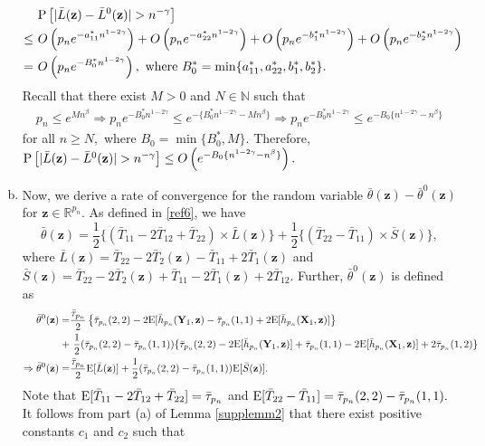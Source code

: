 \documentclass[twoside]{article}
\newcommand{\bX}{\mathbf{X}}
\newcommand{\bY}{\mathbf{Y}}
\newcommand{\bz}{\mathbf{z}}
\newcommand{\0}{\mathbf{0}}
\newcommand{\1}{\mathbf{1}}
\numberwithin{equation}{section}
\begin{document}
\begin{enumerate}[(a)]
\begin{align*}
 &\ {\rm P}\left [|\bar{L}(\bz)- \bar{L}^0(\bz) |>n^{-\gamma}\right ]\\
 \leq &\ O\left (p_ne^{-a^*_{11}n^{1-2\gamma}}\right ) + O\left (p_ne^{-a^*_{22}n^{1-2\gamma}}\right )+O\left( p_n e^{-b^*_1 n^{1-2\gamma}}\right ) + O\left( p_n e^{-b^*_2 n^{1-2\gamma}}\right )\\
 =&\ O\left (p_ne^{-B^*_0 n^{1-2\gamma}}\right ),\text{ where }B^*_0 = \min\{a^*_{11},a^*_{22},b^*_{1},b^*_{2}\}.
\end{align*}
Recall that there exist $M>0$ and $N\in\mathbb{N}$ such that
\begin{align*}
p_n\le e^{Mn^\beta}
\Rightarrow  p_ne^{-B^*_0 n^{1-2\gamma}}\le e^{-\{B^*_0 n^{1-2\gamma}-Mn^\beta\}}
\Rightarrow  p_ne^{-B^*_0 n^{1-2\gamma}}\le e^{-B_0\{ n^{1-2\gamma}-n^\beta\}}
\end{align*}
for all $n\ge N,$ where $B_0=\min\{B^*_0,M\}.$ Therefore, ${\rm P}\left [|\bar{L}(\bz)- \bar{L}^0(\bz) |>n^{-\gamma}\right ]\leq O\left (e^{-B_0\{ n^{1-2\gamma}-n^\beta\}}\right ).$
\item Now, we derive a rate of convergence for the random variable $\bar{\theta}(\bz)-\bar{\theta}^0(\bz)$ for $\bz\in\mathbb{R}^{p_n}.$ As defined in \eqref{ref6}, we have $$\bar{\theta}(\bz) = \frac{1}{2}\big \{(\bar{T}_{11}-2\bar{T}_{12}+\bar{T}_{22})\times \bar{L}(\bz)\big \}
 +\frac{1}{2}\big \{(\bar{T}_{22}-\bar{T}_{11})\times \bar{S}(\bz)\big \},$$
 where $\bar{L}(\bz) = \bar{T}_{22} - 2\bar{T}_2(\bz) - \bar{T}_{11} + 2\bar{T}_1(\bz)$ and $\bar{S}(\bz) = \bar{T}_{22} - 2\bar{T}_2(\bz) + \bar{T}_{11} - 2\bar{T}_1(\bz)+2\bar{T}_{12}$.
 Further, $\bar{\theta}^0(\bz)$ is defined as
 \begin{align*}
  \bar{\theta}^0(\bz) = &\frac{\bar{\tau}_{p_n}}{2}\left \{\bar{\tau}_{p_n}(2,2)-2{\rm E}[\bar{h}_{p_n}(\bY_1,\bz)-\bar{\tau}_{p_n}(1,1)+2{\rm E}[\bar{h}_{p_n}(\bX_1,\bz)]\right \}\\
  +&\ \frac{1}{2}(\bar{\tau}_{p_n}(2,2)-\bar{\tau}_{p_n}(1,1))\{\bar{\tau}_{p_n}(2,2)-2{\rm E}[\bar{h}_{p_n}(\bY_1,\bz)]+\bar{\tau}_{p_n}(1,1)-2{\rm E}[\bar{h}_{p_n}(\bX_1,\bz)]+2\bar{\tau}_{p_n}(1,2)\}\\
  \Rightarrow\bar{\theta}^0(\bz) = &\frac{\bar{\tau}_{p_n}}{2}{\rm E}[\bar{L}(\bz)]+\frac{1}{2}(\bar{\tau}_{p_n}(2,2)-\bar{\tau}_{p_n}(1,1)){\rm E}[\bar{S}(\bz)].
 \end{align*}
 Note that ${\rm E}[\bar{T}_{11}-2\bar{T}_{12}+\bar{T}_{22}]=\bar{\tau}_{p_n}$ and ${\rm E}[\bar{T}_{22}-\bar{T}_{11}]=\bar{\tau}_{p_n}(2,2)-\bar{\tau}_{p_n}(1,1).$ It follows from part (a) of Lemma \ref{supplemm2} that there exist positive constants $c_1$ and $c_2$ such that

\end{enumerate}
\end{document}
